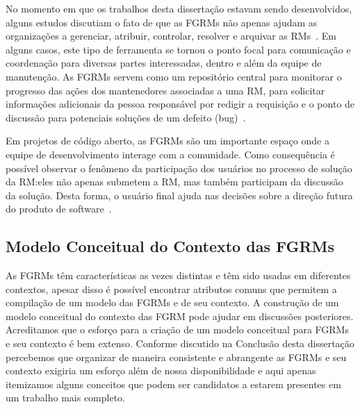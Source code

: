 No momento em que os trabalhos desta dissertação estavam sendo desenvolvidos,
alguns estudos discutiam o fato de que as FGRMs não apenas ajudam as
organizações a gerenciar, atribuir, controlar, resolver e arquivar as
RMs~\cite{Bertram:2010:CCB:1718918.1718972}.  Em alguns casos, este tipo de
ferramenta se tornou o ponto focal para comunicação e coordenação para diversas
partes interessadas, dentro e além da equipe de manutenção. As FGRMs servem
como um repositório central para monitorar o progresso das ações dos
mantenedores associadas a uma RM, para solicitar informações adicionais da
pessoa responsável por redigir a requisição e o ponto de discussão para
potenciais soluções de um defeito (bug)~\cite{zimmermann2009improving}.

Em projetos de código aberto, as FGRMs são um importante espaço onde a equipe de
desenvolvimento interage com a comunidade. Como consequência é possível observar
o fenômeno da participação dos usuários no processo de solução da RM:\@ eles não
apenas submetem a RM, mas também participam da discussão da solução. Desta
forma, o usuário final ajuda nas decisões sobre a direção futura do produto de
software~\cite{breu2010information}.

\subsection{Modelo Conceitual do Contexto das FGRMs}\label{sub:espectro_funcionalidades_fgrm}

As FGRMs têm características as vezes distintas e têm sido usadas em diferentes
contextos, apesar disso é possível encontrar atributos comuns que permitem a
compilação de um modelo das FGRMs e de seu contexto. A construção de um modelo
conceitual do contexto das FGRM pode ajudar em discussões posteriores.
Acreditamos que o esforço para a criação de um modelo conceitual para FGRMs e
seu contexto é bem extenso. Conforme discutido na Conclusão desta dissertação
percebemos que organizar de maneira consistente e abrangente as FGRMs e seu
contexto exigiria um esforço além de nossa disponibilidade e aqui apenas
itemizamos alguns conceitos que podem ser candidatos a estarem presentes em um
trabalho mais completo.

